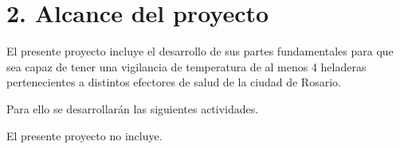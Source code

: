 \section{2. Alcance del proyecto}
\label{sec:alcance}


El presente proyecto incluye el desarrollo de sus partes fundamentales para que sea capaz de tener una vigilancia de temperatura de al menos 4 heladeras pertenecientes a distintos efectores de salud de la ciudad de Rosario. 

Para ello se desarrollarán las siguientes actividades.



El presente proyecto no incluye.